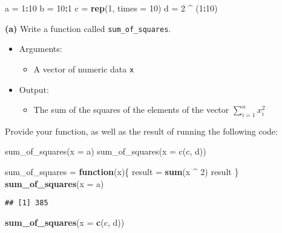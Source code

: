 \documentclass[]{article}
\newenvironment{Shaded}{\begin{snugshade}}{\end{snugshade}}
\newcommand{\ControlFlowTok}[1]{\textcolor[rgb]{0.13,0.29,0.53}{\textbf{#1}}}
\newcommand{\DataTypeTok}[1]{\textcolor[rgb]{0.13,0.29,0.53}{#1}}
\newcommand{\DecValTok}[1]{\textcolor[rgb]{0.00,0.00,0.81}{#1}}
\newcommand{\KeywordTok}[1]{\textcolor[rgb]{0.13,0.29,0.53}{\textbf{#1}}}
\newcommand{\NormalTok}[1]{#1}
\newcommand{\OperatorTok}[1]{\textcolor[rgb]{0.81,0.36,0.00}{\textbf{#1}}}
\newcommand{\StringTok}[1]{\textcolor[rgb]{0.31,0.60,0.02}{#1}}
\providecommand{\tightlist}{%
  \setlength{\itemsep}{0pt}\setlength{\parskip}{0pt}}
\begin{document}
\begin{Shaded}
\begin{Highlighting}[]
\NormalTok{a =}\StringTok{ }\DecValTok{1}\OperatorTok{:}\DecValTok{10}
\NormalTok{b =}\StringTok{ }\DecValTok{10}\OperatorTok{:}\DecValTok{1}
\NormalTok{c =}\StringTok{ }\KeywordTok{rep}\NormalTok{(}\DecValTok{1}\NormalTok{, }\DataTypeTok{times =} \DecValTok{10}\NormalTok{)}
\NormalTok{d =}\StringTok{ }\DecValTok{2} \OperatorTok{^}\StringTok{ }\NormalTok{(}\DecValTok{1}\OperatorTok{:}\DecValTok{10}\NormalTok{)}
\end{Highlighting}
\end{Shaded}

\textbf{(a)} Write a function called \texttt{sum\_of\_squares}.

\begin{itemize}
\tightlist
\item
  Arguments:

  \begin{itemize}
  \tightlist
  \item
    A vector of numeric data \texttt{x}
  \end{itemize}
\item
  Output:

  \begin{itemize}
  \tightlist
  \item
    The sum of the squares of the elements of the vector
    \(\sum_{i = 1}^n x_i^2\)
  \end{itemize}
\end{itemize}

Provide your function, as well as the result of running the following
code:

sum\_of\_squares(x = a) sum\_of\_squares(x = c(c, d))

\begin{Shaded}
\begin{Highlighting}[]
\NormalTok{sum_of_squares =}\StringTok{ }\ControlFlowTok{function}\NormalTok{(x)\{}
\NormalTok{  result =}\StringTok{ }\KeywordTok{sum}\NormalTok{(x }\OperatorTok{^}\StringTok{ }\DecValTok{2}\NormalTok{)}
\NormalTok{  result}
\NormalTok{\}}
\KeywordTok{sum_of_squares}\NormalTok{(}\DataTypeTok{x =}\NormalTok{ a)}
\end{Highlighting}
\end{Shaded}

\begin{verbatim}
## [1] 385
\end{verbatim}

\begin{Shaded}
\begin{Highlighting}[]
\KeywordTok{sum_of_squares}\NormalTok{(}\DataTypeTok{x =} \KeywordTok{c}\NormalTok{(c, d))}
\end{Highlighting}
\end{Shaded}
\end{document}
